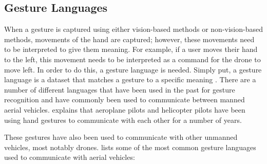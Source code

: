 \subsection{Gesture Languages}
When a gesture is captured using either vision-based methods or non-vision-based methods, movements of the hand are captured; however, these movements need to be interpreted to give them meaning. For example, if a user moves their hand to the left, this movement needs to be interpreted as a command for the drone to move left. In order to do this, a gesture language is needed. Simply put, a gesture language is a dataset that matches a gesture to a specific meaning \citep{Patrona2021}. There are a number of different languages that have been used in the past for gesture recognition and have commonly been used to communicate between manned aerial vehicles. \cite{Patrona2021} explains that aeroplane pilots and helicopter pilots have been using hand gestures to communicate with each other for a number of years. 

These gestures have also been used to communicate with other unmanned vehicles, most notably drones. \cite{Patrona2021} lists some of the most common gesture languages used to communicate with aerial vehicles: 

